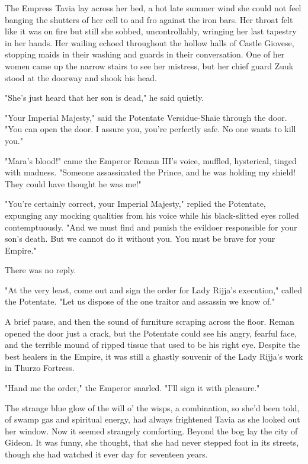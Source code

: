\clearpage
{}

\dropcap The Empress Tavia lay across her bed, a hot late summer wind she could not feel banging the shutters of her cell to and fro against the iron bars. Her throat felt like it was on fire but still she sobbed, uncontrollably, wringing her last tapestry in her hands. Her wailing echoed throughout the hollow halls of Castle Giovese, stopping maids in their washing and guards in their conversation. One of her women came up the narrow stairs to see her mistress, but her chief guard Zuuk stood at the doorway and shook his head.

"She's just heard that her son is dead," he said quietly.

"Your Imperial Majesty," said the Potentate Versidue-Shaie through the door. "You can open the door. I assure you, you're perfectly safe. No one wants to kill you."

"Mara's blood!" came the Emperor Reman III's voice, muffled, hysterical, tinged with madness. "Someone assassinated the Prince, and he was holding my shield! They could have thought he was me!"

"You're certainly correct, your Imperial Majesty," replied the Potentate, expunging any mocking qualities from his voice while his black-slitted eyes rolled contemptuously. "And we must find and punish the evildoer responsible for your son's death. But we cannot do it without you. You must be brave for your Empire."

There was no reply.

"At the very least, come out and sign the order for Lady Rijja's execution," called the Potentate. "Let us dispose of the one traitor and assassin we know of."

A brief pause, and then the sound of furniture scraping across the floor. Reman opened the door just a crack, but the Potentate could see his angry, fearful face, and the terrible mound of ripped tissue that used to be his right eye. Despite the best healers in the Empire, it was still a ghastly souvenir of the Lady Rijja's work in Thurzo Fortress.

"Hand me the order," the Emperor snarled. "I'll sign it with pleasure."

The strange blue glow of the will o' the wisps, a combination, so she'd been told, of swamp gas and spiritual energy, had always frightened Tavia as she looked out her window. Now it seemed strangely comforting. Beyond the bog lay the city of Gideon. It was funny, she thought, that she had never stepped foot in its streets, though she had watched it ever day for seventeen years.

